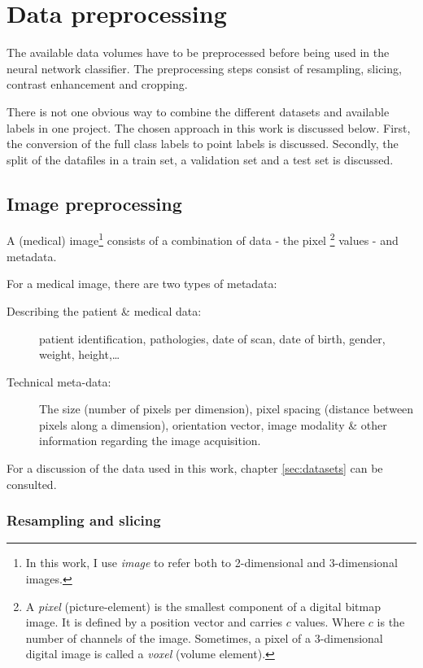 \chapter{Data preprocessing}

The available data volumes have to be preprocessed before being used in the neural network classifier.
The preprocessing steps consist of resampling, slicing, contrast enhancement and cropping.  

There is not one obvious way to combine the different datasets and available labels in one project.
The chosen approach in this work is discussed below.
First, the conversion of the full class labels to point labels is discussed. 
Secondly, the split of the datafiles in a train set, a validation set and a test set is discussed.

\section{Image preprocessing}

A (medical) image\footnote{In this work, I use \textit{image} to refer both to 2-dimensional and 3-dimensional images.} consists of a combination of data - the pixel
\footnote{A \textit{pixel} (picture-element) is the smallest component of a digital bitmap image. 
It is defined by a position vector and carries $c$ values. Where $c$ is the number of channels of the image. 
Sometimes, a pixel of a 3-dimensional digital image is called a \textit{voxel} (volume element).} 
values - and metadata.

For a medical image, there are two types of metadata:
\begin{description}
    \item [Describing the patient \& medical data:] patient identification, pathologies, date of scan, date of birth, gender, weight, height,\dots
    \item [Technical meta-data:] The size (number of pixels per dimension), pixel spacing (distance between pixels along a dimension), orientation vector, image modality \& other information regarding the image acquisition.
\end{description}

For a discussion of the data used in this work, chapter \ref{sec:datasets} can be consulted. 

\subsection{Resampling and slicing\label{sec:resampling}}

